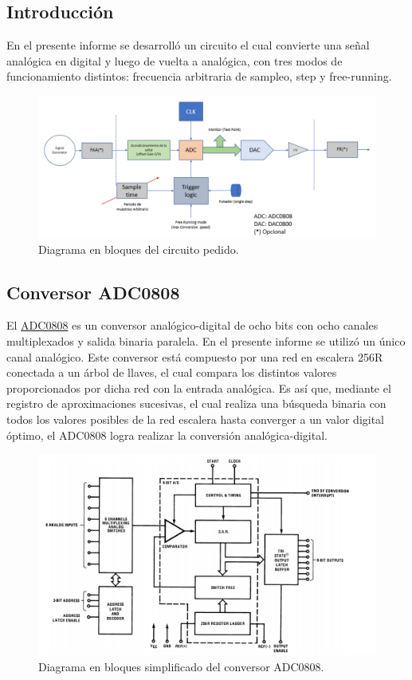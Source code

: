 



\subsection{Introducción}

En el presente informe se desarrolló un circuito el cual convierte una señal analógica en digital y luego de vuelta a analógica, con tres modos de funcionamiento distintos: frecuencia arbitraria de sampleo, step y free-running.

\begin{figure}[H]
\centering
\includegraphics[width=0.9\linewidth]{ImagenesEjercicio1/consigna.png}
\caption{Diagrama en bloques del circuito pedido.}
\label{consigna}
\end{figure}

\subsection{Conversor ADC0808}

El \href{https://www.ti.com/lit/ds/symlink/adc0808-n.pdf}{ADC0808} es un conversor analógico-digital de ocho bits con ocho canales multiplexados y salida binaria paralela. En el presente informe se utilizó un único canal analógico. Este conversor está compuesto por una red en escalera 256R conectada a un árbol de llaves, el cual compara los distintos valores proporcionados por dicha red con la entrada analógica. Es así que, mediante el registro de aproximaciones sucesivas, el cual realiza una búsqueda binaria con todos los valores posibles de la red escalera hasta converger a un valor digital óptimo, el ADC0808 logra realizar la conversión analógica-digital.

\begin{figure}[H]
\centering
\includegraphics[width=0.75\linewidth]{ImagenesEjercicio1/ADC_BLOCK.png}
\caption{Diagrama en bloques simplificado del conversor ADC0808.}
\label{ADC_BLOCK}
\end{figure}

